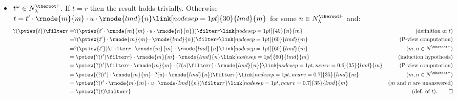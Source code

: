 \begin{itemize}
\item $t^\omega \in N^{\theroot\vdash}_\lambda$. If $t=r$ then the result holds trivially.
Otherwise $t =  t' \cdot \rnode{m}{m} \cdot u \cdot
\rnode{lmd}{n} \link[nodesep=1pt]{30}{lmd}{m}$ for some $n\in
    N^{\theroot \vdash}_\lambda$ and:
        \begin{align*}
        ?(\pview{t}) \filter  r
        &= ?(\pview{t' \cdot \rnode{m}{m} \cdot u \cdot \rnode{n}{n}}) \filter  r
               \link[nodesep=1pt]{40}{n}{m}                   & (\mbox{definition of } t)\\
        &= ?(\pview{t'} \cdot \rnode{m}{m} \cdot  \rnode{lmd}{n} ) \filter  r
               \link[nodesep=1pt]{60}{lmd}{m}                 & (\mbox{P-view computation}) \\
        &= ?(\pview{t'}) \filter  r \cdot \rnode{m}{m} \cdot  \rnode{lmd}{n}
               \link[nodesep=1pt]{60}{lmd}{m}                 & (m, n \in N^{\theroot \vdash}) \\
        &= \pview{?(t')\filter r}  \cdot \rnode{m}{m} \cdot  \rnode{lmd}{n}
               \link[nodesep=1pt]{60}{lmd}{m}                 & \mbox{(induction hypothesis)} \\
        &= \pview{ ?(t') \filter r \cdot \rnode{m}{m} \cdot (?(u) \filter r) \cdot \rnode{lmd}{n}}
\link[nodesep=1pt,ncurv=0.6]{35}{lmd}{m}                                                          & (\mbox{P-view computation}) \\
        &= \pview{ (?(t') \cdot \rnode{m}{m} \cdot\ ?(u) \cdot \rnode{lmd}{n}) \filter r }
\link[nodesep=1pt,ncurv=0.7]{35}{lmd}{m}                                                          & (m, n \in N^{\theroot \vdash}) \\
        &= \pview{ ?(t' \cdot \rnode{m}{m} \cdot u \cdot \rnode{lmd}{n}) \filter r }
\link[nodesep=1pt,ncurv=0.7]{35}{lmd}{m}                                                          & \mbox{($m$ and $n$ are unanswered)} \\
        &= \pview{ ?(t) \filter r }                & \mbox{(def. of $t$).} \qed
        \end{align*}
\end{itemize}
